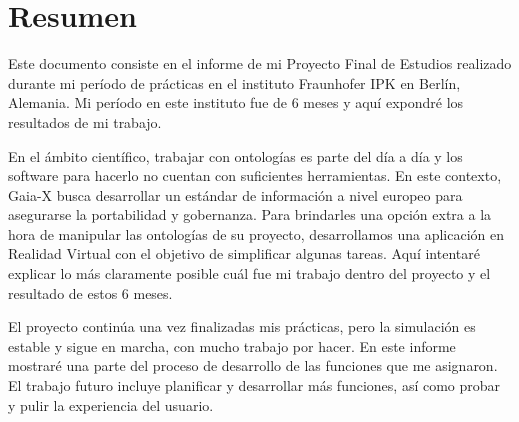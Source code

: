 \chapter*{Resumen}

Este documento consiste en el informe de mi Proyecto Final de Estudios realizado durante mi período de prácticas en el instituto Fraunhofer IPK en Berlín, Alemania. Mi período en este instituto fue de 6 meses y aquí expondré los resultados de mi trabajo.

En el ámbito científico, trabajar con ontologías es parte del día a día y los software para hacerlo no cuentan con suficientes herramientas. En este contexto, Gaia-X busca desarrollar un estándar de información a nivel europeo para asegurarse la portabilidad y gobernanza. Para brindarles una opción extra a la hora de manipular las ontologías de su proyecto, desarrollamos una aplicación en Realidad Virtual con el objetivo de simplificar algunas tareas.
Aquí intentaré explicar lo más claramente posible cuál fue mi trabajo dentro del proyecto y el resultado de estos 6 meses.

El proyecto continúa una vez finalizadas mis prácticas, pero la simulación es estable y sigue en marcha, con mucho trabajo por hacer. En este informe mostraré una parte del proceso de desarrollo de las funciones que me asignaron.
El trabajo futuro incluye planificar y desarrollar más funciones, así como probar y pulir la experiencia del usuario.
